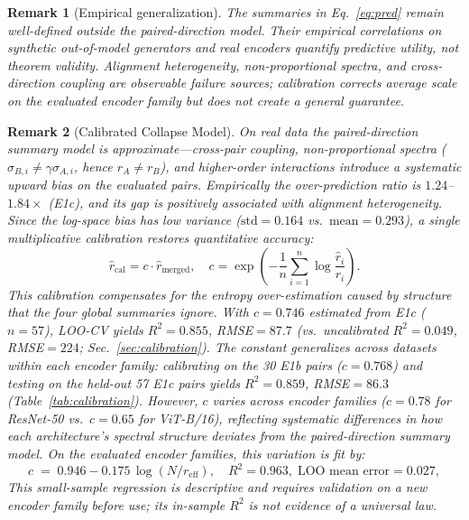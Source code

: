 \documentclass{article}
\newcommand{\reff}{\ensuremath{r_{\mathrm{eff}}}\xspace}
\newtheorem{remark}{Remark}
\begin{document}
\begin{remark}[Empirical generalization]
The summaries in Eq.~\eqref{eq:pred} remain well-defined outside the
paired-direction model.  Their empirical correlations on synthetic
out-of-model generators and real encoders quantify predictive utility,
not theorem validity.  Alignment heterogeneity, non-proportional spectra,
and cross-direction coupling are observable failure sources; calibration
corrects average scale on the evaluated encoder family but does not create
a general guarantee.
\end{remark}

\begin{remark}[Calibrated Collapse Model]
\label{rem:calibration}
On real data the paired-direction summary model is approximate---cross-pair
coupling, non-proportional spectra ($\sigma_{B,i}\neq\gamma\sigma_{A,i}$,
hence $r_A\neq r_B$), and higher-order interactions introduce
a systematic upward bias on the evaluated pairs.
Empirically the over-prediction ratio is $1.24$--$1.84\times$ (E1c),
and its gap is positively associated with alignment heterogeneity.
Since the log-space bias has low variance
($\mathrm{std}=0.164$ vs.\ $\mathrm{mean}=0.293$),
a single multiplicative calibration restores quantitative accuracy:
\begin{equation}
  \hat{r}_{\mathrm{cal}} = c\cdot\hat{r}_{\mathrm{merged}},\quad
  c = \exp\!\left(-\frac{1}{n}\sum_{i=1}^n\log\frac{\hat{r}_i}{r_i}\right).
  \label{eq:calibration}
\end{equation}
This calibration compensates for the entropy over-estimation
caused by structure that the four global summaries ignore.
With $c{=}0.746$ estimated from E1c ($n{=}57$),
LOO-CV yields $R^2{=}0.855$, RMSE${=}87.7$ (vs.\ uncalibrated $R^2{=}0.049$,
RMSE${=}224$; Sec.~\ref{sec:calibration}).
The constant generalizes across datasets within each encoder family:
calibrating on the 30 E1b pairs ($c{=}0.768$)
and testing on the held-out 57 E1c pairs yields $R^2{=}0.859$, RMSE${=}86.3$
(Table~\ref{tab:calibration}).
However, $c$ varies across encoder families
($c{=}0.78$ for ResNet-50 vs.\ $c{=}0.65$ for ViT-B/16),
reflecting systematic differences in how each architecture's spectral structure
deviates from the paired-direction summary model.
On the evaluated encoder families, this variation is fit by:
\begin{equation}
  c \;=\; 0.946 - 0.175\,\log(N/\reff),
  \quad R^2{=}0.963,\;\text{LOO mean error}{=}0.027,
  \label{eq:universal_c}
\end{equation}
This small-sample regression is descriptive and requires validation on a
new encoder family before use; its in-sample $R^2$ is not evidence of a
universal law.
\end{remark}
\end{document}
